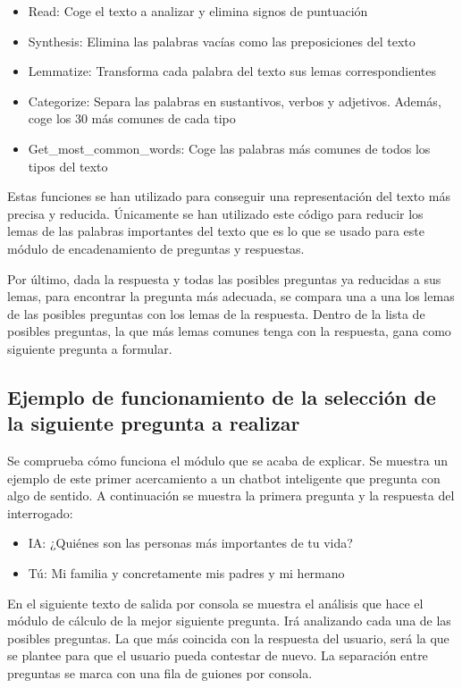\begin{itemize}
	\item Read: Coge el texto a analizar y elimina signos de puntuación
	\item Synthesis: Elimina las palabras vacías como las preposiciones del texto
	\item Lemmatize: Transforma cada palabra del texto sus lemas correspondientes
	\item Categorize: Separa las palabras en sustantivos, verbos y adjetivos. Además, coge los 30 más comunes de cada tipo
	\item Get\_most\_common\_words: Coge las palabras más comunes de todos los tipos del texto
\end{itemize}

Estas funciones se han utilizado para conseguir una representación del texto más precisa y reducida. Únicamente se han utilizado este código para reducir los lemas de las palabras importantes del texto que es lo que se usado para este módulo de encadenamiento de preguntas y respuestas. 

Por último, dada la respuesta y todas las posibles preguntas ya reducidas a sus lemas, para encontrar la pregunta más adecuada, se compara una a una los lemas de las posibles preguntas con los lemas de la respuesta. Dentro de la lista de posibles preguntas, la que más lemas comunes tenga con la respuesta, gana como siguiente pregunta a formular.

\subsection{Ejemplo de funcionamiento de la selección de la siguiente pregunta a realizar}

Se comprueba cómo funciona el módulo que se acaba de explicar. Se muestra un ejemplo de este primer acercamiento a un chatbot inteligente que pregunta con algo de sentido. A continuación se muestra la primera pregunta y la respuesta del interrogado:

\begin{itemize}
	\item[] IA: ¿Quiénes son las personas más importantes de tu vida?
	\item[] Tú: Mi familia y concretamente mis padres y mi hermano
\end{itemize}

En el siguiente texto de salida por consola se muestra el análisis que hace el módulo de cálculo de la mejor siguiente pregunta. Irá analizando cada una de las posibles preguntas. La que más coincida con la respuesta del usuario, será la que se plantee para que el usuario pueda contestar de nuevo. La separación entre preguntas se marca con una fila de guiones por consola.

